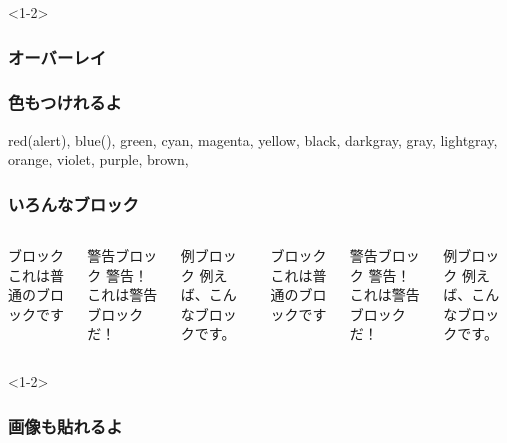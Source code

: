 \documentclass[dvipdfmx,10pt,notheorems]{beamer}
\theoremstyle{definition}
\newtheorem{theorem}{定理}
\begin{document}
\begin{frame}<1-2>\frametitle{オーバーレイ}
\end{frame}

\begin{frame}\frametitle{色もつけれるよ}
  {\color{red} red}(\alert{alert}),
  {\color{blue} blue}(),
  {\color{green} green},
  {\color{cyan} cyan},
  {\color{magenta} magenta},
  {\color{yellow} yellow},
  {\color{black} black},
  {\color{darkgray} darkgray},
  {\color{gray} gray},
  {\color{lightgray} lightgray},
  {\color{orange} orange},
  {\color{violet} violet},
  {\color{purple} purple},
  {\color{brown} brown},
\end{frame}

\begin{frame}\frametitle{いろんなブロック}
  \begin{columns}[T,onlytextwidth]
    \begin{block}{ブロック}
      これは普通のブロックです
    \end{block}

    \begin{alertblock}{警告ブロック}
       警告！これは警告ブロックだ！
    \end{alertblock}

    \begin{exampleblock}{例ブロック}
      例えば、こんなブロックです。
    \end{exampleblock}

    \begin{block}{ブロック}
      これは普通のブロックです
    \end{block}

    \begin{alertblock}{警告ブロック}
      警告！これは警告ブロックだ！
    \end{alertblock}

    \begin{exampleblock}{例ブロック}
      例えば、こんなブロックです。
    \end{exampleblock}
  \end{columns}
\end{frame}

\begin{frame}<1-2>\frametitle{画像も貼れるよ}
\end{frame}
\end{document}
